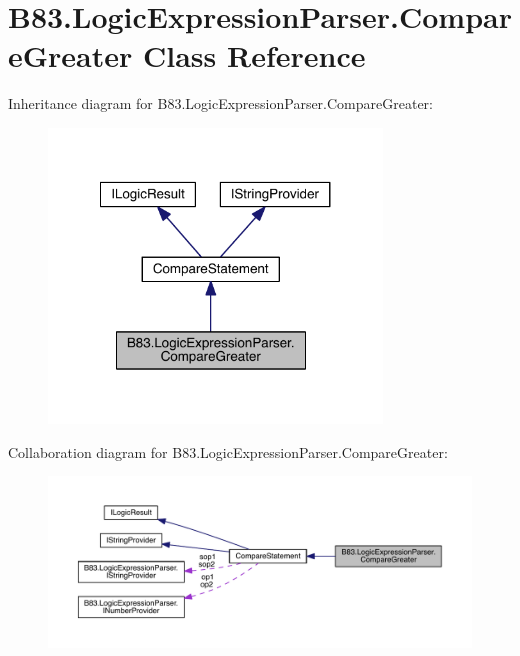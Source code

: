 \hypertarget{class_b83_1_1_logic_expression_parser_1_1_compare_greater}{}\section{B83.\+Logic\+Expression\+Parser.\+Compare\+Greater Class Reference}
\label{class_b83_1_1_logic_expression_parser_1_1_compare_greater}


Inheritance diagram for B83.\+Logic\+Expression\+Parser.\+Compare\+Greater\+:\nopagebreak
\begin{figure}[H]
\begin{center}
\leavevmode
\includegraphics[width=251pt]{class_b83_1_1_logic_expression_parser_1_1_compare_greater__inherit__graph}
\end{center}
\end{figure}


Collaboration diagram for B83.\+Logic\+Expression\+Parser.\+Compare\+Greater\+:\nopagebreak
\begin{figure}[H]
\begin{center}
\leavevmode
\includegraphics[width=350pt]{class_b83_1_1_logic_expression_parser_1_1_compare_greater__coll__graph}
\end{center}
\end{figure}
